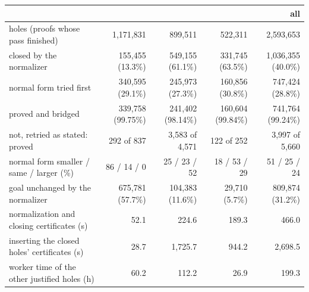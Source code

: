 \begin{tabular}{lrrrr}
\toprule
 & \UF{} & \LIA{} & \LRA{} & all \\
\midrule
holes (proofs whose pass finished) & 1,171,831 & 899,511 & 522,311 & 2,593,653 \\
closed by the normalizer & 155,455 (13.3\%) & 549,155 (61.1\%) & 331,745 (63.5\%) & 1,036,355 (40.0\%) \\
normal form tried first & 340,595 (29.1\%) & 245,973 (27.3\%) & 160,856 (30.8\%) & 747,424 (28.8\%) \\
\quad proved and bridged & 339,758 (99.75\%) & 241,402 (98.14\%) & 160,604 (99.84\%) & 741,764 (99.24\%) \\
\quad not, retried as stated: proved & 292 of 837 & 3,583 of 4,571 & 122 of 252 & 3,997 of 5,660 \\
\quad normal form smaller / same / larger (\%) & 86 / 14 / 0 & 25 / 23 / 52 & 18 / 53 / 29 & 51 / 25 / 24 \\
goal unchanged by the normalizer & 675,781 (57.7\%) & 104,383 (11.6\%) & 29,710 (5.7\%) & 809,874 (31.2\%) \\
\midrule
normalization and closing certificates (s) & 52.1 & 224.6 & 189.3 & 466.0 \\
inserting the closed holes' certificates (s) & 28.7 & 1,725.7 & 944.2 & 2,698.5 \\
worker time of the other justified holes (h) & 60.2 & 112.2 & 26.9 & 199.3 \\
\bottomrule
\end{tabular}
